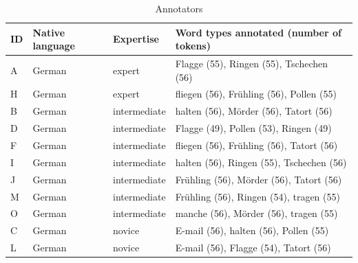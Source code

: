 	
	\begin{table}[htb]
		\centering
		\caption{Annotators }
		
		\begin{tabularx}{\textwidth}{lllX}
		\toprule
		ID & Native language & Expertise & Word types annotated (number of tokens) \\
		\midrule
		A	&	German	& expert & Flagge (55),  Ringen (55), Tschechen (56) \\
		

		H & German & expert &		 fliegen (56), Fr\"{u}hling (56),  Pollen (55) \\		
		
		
		B	&	German	& intermediate & 	halten (56),  M\"{o}rder (56),     Tatort (56) \\
		
		

		D &	German & intermediate &		Flagge (49),  Pollen (53), Ringen (49)	 %
		\\
		

		
		F & 	German	 & intermediate & 	 fliegen (56), Fr\"{u}hling (56), Tatort (56)	 \\
		

		

		I & 	German & intermediate &		halten (56), Ringen (55), Tschechen (56)	 \\
		
		J &	German	 & intermediate & Fr\"{u}hling (56), M\"{o}rder (56),    Tatort (56) \\
		

		
		
		M & 	German	 & intermediate & Fr\"{u}hling (56), Ringen (54),   tragen (55)	 \\
		
		O	& German	 & intermediate & manche (56), Mörder (56),    tragen (55) \\




		
		C & German & novice & 	 E-mail (56), halten (56),  Pollen (55)	 \\
		
		
		L & German	 & novice & E-mail (56), Flagge (54),  Tatort (56) \\
		


\end{tabularx}
\end{table}
